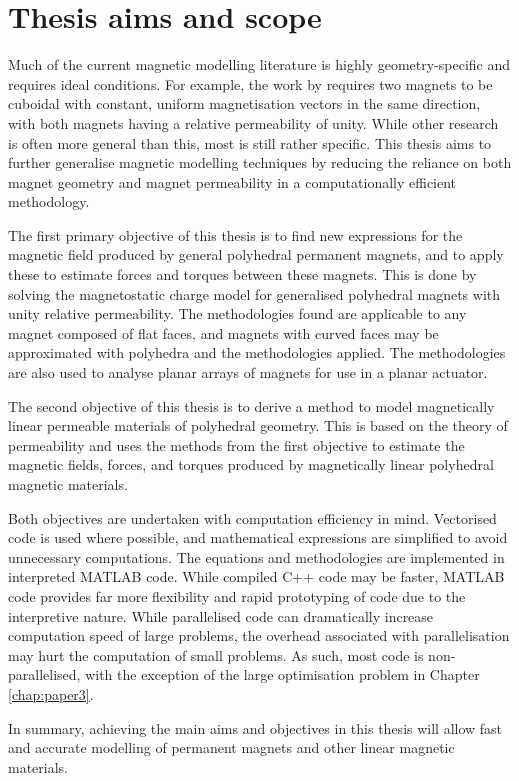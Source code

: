 \section{Thesis aims and scope}
Much of the current magnetic modelling literature is highly geometry-specific and requires ideal conditions. For example, the work by \textcite{Akoun1984} requires two magnets to be cuboidal with constant, uniform magnetisation vectors in the same direction, with both magnets having a relative permeability of unity. While other research is often more general than this, most is still rather specific. This thesis aims to further generalise magnetic modelling techniques by reducing the reliance on both magnet geometry and magnet permeability in a computationally efficient methodology.

The first primary objective of this thesis is to find new expressions for the magnetic field produced by general polyhedral permanent magnets, and to apply these to estimate forces and torques between these magnets. This is done by solving the magnetostatic charge model for generalised polyhedral magnets with unity relative permeability. The methodologies found are applicable to any magnet composed of flat faces, and magnets with curved faces may be approximated with polyhedra and the methodologies applied. The methodologies are also used to analyse planar arrays of magnets for use in a planar actuator.

The second objective of this thesis is to derive a method to model magnetically linear permeable materials of polyhedral geometry. This is based on the theory of permeability and uses the methods from the first objective to estimate the magnetic fields, forces, and torques produced by magnetically linear polyhedral magnetic materials.

Both objectives are undertaken with computation efficiency in mind. Vectorised code is used where possible, and mathematical expressions are simplified to avoid unnecessary computations. The equations and methodologies are implemented in interpreted MATLAB code. While compiled C++ code may be faster, MATLAB code provides far more flexibility and rapid prototyping of code due to the interpretive nature. While parallelised code can dramatically increase computation speed of large problems, the overhead associated with parallelisation may hurt the computation of small problems. As such, most code is non-parallelised, with the exception of the large optimisation problem in Chapter \ref{chap:paper3}.

In summary, achieving the main aims and objectives in this thesis will allow fast and accurate modelling of permanent magnets and other linear magnetic materials.

